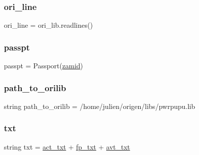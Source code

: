 \mbox{\label{namespaceconv__xslib_a3c3d66214a7b142665fc74268c938fbd}} 
\subsubsection{\texorpdfstring{ori\+\_\+line}{ori\_line}}
{\footnotesize\ttfamily ori\+\_\+line = ori\+\_\+lib.\+readlines()}

\mbox{\label{namespaceconv__xslib_a509dab52fb0b74381dbe7b5b5af51aa0}} 
\subsubsection{\texorpdfstring{passpt}{passpt}}
{\footnotesize\ttfamily passpt = Passport(\mbox{\hyperlink{namespaceconv__xslib_af70f0d4a2383a49278fdbcb77d9c5075}{zamid}})}

\mbox{\label{namespaceconv__xslib_a382f7569a1d317301a7278132800a5aa}} 
\subsubsection{\texorpdfstring{path\+\_\+to\+\_\+orilib}{path\_to\_orilib}}
{\footnotesize\ttfamily string path\+\_\+to\+\_\+orilib = \textquotesingle{}/home/julien/origen/libs/pwrpupu.\+lib\textquotesingle{}}

\mbox{\label{namespaceconv__xslib_af306301328dca1eed4e07dc5350e8569}} 
\subsubsection{\texorpdfstring{txt}{txt}}
{\footnotesize\ttfamily string txt = \mbox{\hyperlink{namespaceconv__xslib_a5588daf6fd7dfde8180f1981bd3e8443}{act\+\_\+txt}} + \mbox{\hyperlink{namespaceconv__xslib_abcdb1a110e2a54bac4567f258e4e314f}{fp\+\_\+txt}} + \mbox{\hyperlink{namespaceconv__xslib_a76d920bafd8fdcc24379791482eeae00}{avt\+\_\+txt}}}

